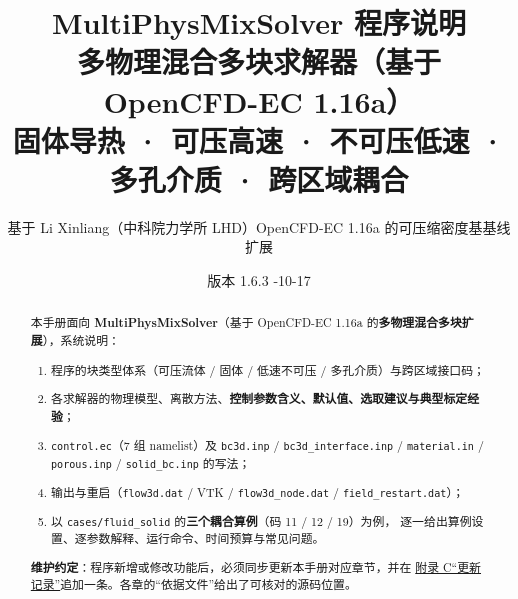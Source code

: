 \documentclass[11pt,a4paper,fontset=fandol]{ctexart}
\title{\bfseries MultiPhysMixSolver 程序说明\\[0.4em]
 \large 多物理混合多块求解器（基于 OpenCFD-EC 1.16a）\\[0.2em]
 \normalsize 固体导热 · 可压高速 · 不可压低速 · 多孔介质 · 跨区域耦合}
\author{基于 Li Xinliang（中科院力学所 LHD）OpenCFD-EC 1.16a 的可压缩密度基基线扩展}
\date{版本 1.6.3 \quad 2026-10-17}
\newcommand{\code}[1]{\texttt{#1}}
\begin{document}
\maketitle

\begin{abstract}
\noindent
本手册面向 \textbf{MultiPhysMixSolver}（基于 OpenCFD-EC 1.16a 的\textbf{多物理混合多块扩展}），系统说明：
\begin{enumerate}
  \item 程序的块类型体系（可压流体 / 固体 / 低速不可压 / 多孔介质）与跨区域接口码；
  \item 各求解器的物理模型、离散方法、\textbf{控制参数含义、默认值、选取建议与典型标定经验}；
  \item \code{control.ec}（7 组 namelist）及 \code{bc3d.inp} / \code{bc3d\_interface.inp} /
        \code{material.in} / \code{porous.inp} / \code{solid\_bc.inp} 的写法；
  \item 输出与重启（\code{flow3d.dat} / VTK / \code{flow3d\_node.dat} / \code{field\_restart.dat}）；
  \item 以 \code{cases/fluid\_solid} 的\textbf{三个耦合算例}（码 11 / 12 / 19）为例，
        逐一给出算例设置、逐参数解释、运行命令、时间预算与常见问题。
\end{enumerate}
\textbf{维护约定}：程序新增或修改功能后，必须同步更新本手册对应章节，并在
\hyperref[app:changelog]{附录 C“更新记录”}追加一条。各章的“依据文件”给出了可核对的源码位置。
\end{abstract}

\tableofcontents
\clearpage












\appendix



\end{document}
